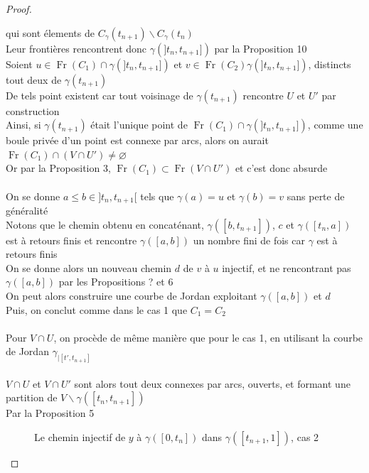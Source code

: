 \documentclass{article}
\begin{document}
\begin{flushleft}
\begin{proof}
\begin{itemize}
        qui sont élements de $C_{\gamma}(t_{n+1})\backslash C_{\gamma}(t_n)$\\
        Leur frontières rencontrent donc $\gamma(]t_n, t_{n+1}])$ par la Proposition 10\\
        Soient $u \in \operatorname{Fr}(C_1) \cap \gamma(]t_n, t_{n+1}])$ et
        $v \in \operatorname{Fr}(C_2) \gamma(]t_n, t_{n+1}])$, distincts tout deux de $\gamma(t_{n+1})$\\
        De tels point existent car tout voisinage de $\gamma(t_{n+1})$ rencontre $U$ et $U'$ par construction\\
        Ainsi, si $\gamma(t_{n+1})$ était l'unique point de $\operatorname{Fr}(C_1) \cap \gamma(]t_n, t_{n+1}])$, comme une boule privée
        d'un point est connexe par arcs, alors on aurait $\operatorname{Fr}(C_1) \cap (V \cap U') \neq \varnothing$\\
        Or par la Proposition 3, $\operatorname{Fr}(C_1) \subset \operatorname{Fr}(V \cap U')$ et c'est donc absurde
        \\~\\ 
        On se donne $a \leq b \in ]t_n, t_{n+1}[$ tels que $\gamma(a) = u$ et $\gamma(b) = v$ sans perte de généralité\\
        Notons que le chemin obtenu en concaténant, $\gamma([b, t_{n+1}])$, $c$ et $\gamma([t_n, a])$ est à retours finis
        et rencontre $\gamma([a, b])$ un nombre fini de fois car $\gamma$ est à retours finis\\
        On se donne alors un nouveau chemin $d$ de $v$ à $u$ injectif, et ne rencontrant pas $\gamma([a, b])$ par les Propositions ? et 6\\
        On peut alors construire une courbe de Jordan exploitant $\gamma([a, b])$ et $d$\\
        Puis, on conclut comme dans le cas 1 que $C_1 = C_2$
        \\~\\
        Pour $V \cap U$, on procède de même manière que pour le cas 1, en utilisant la courbe de Jordan $\gamma_{\mid [t', t_{n+1}]}$
        \\~\\
        $V \cap U$ et $V \cap U'$ sont alors tout deux connexes par arcs, ouverts, et formant une partition de $V \backslash \gamma([t_n, t_{n+1}])$\\
        Par la Proposition 5
        \begin{figure}[h]
            \caption{Le chemin injectif de $y$ à $\gamma([0, t_n])$ dans $\gamma([t_{n+1}, 1])$, cas 2}

\end{figure}
\end{itemize}
\end{proof}
\end{flushleft}
\end{document}
